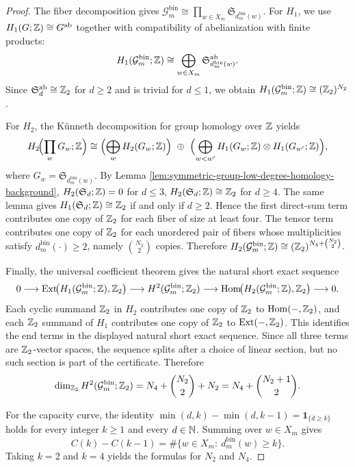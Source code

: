 \begin{proof}
The fiber decomposition gives
\(
\mathcal{G}^{\mathrm{bin}}_m\cong \prod_{w\in X_m}\mathfrak{S}_{d^{\mathrm{bin}}_m(w)}
\).
For \(H_1\), we use \(H_1(G;\mathbb{Z})\cong G^{\mathrm{ab}}\) together with compatibility of abelianization with finite products:
\[
H_1(\mathcal{G}^{\mathrm{bin}}_m;\mathbb{Z})
\cong
\bigoplus_{w\in X_m}\mathfrak{S}_{d^{\mathrm{bin}}_m(w)}^{\mathrm{ab}}.
\]
Since \(\mathfrak{S}_d^{\mathrm{ab}}\cong\mathbb{Z}_2\) for \(d\ge 2\) and is trivial for \(d\le 1\), we obtain
\(
H_1(\mathcal{G}^{\mathrm{bin}}_m;\mathbb{Z})\cong (\mathbb{Z}_2)^{N_2}
\).
\par
For \(H_2\), the K\"unneth decomposition for group homology over \(\mathbb{Z}\) yields
\[
H_2\!\Bigl(\prod_{w}G_w;\mathbb{Z}\Bigr)
\cong
\Bigl(\bigoplus_{w}H_2(G_w;\mathbb{Z})\Bigr)\ \oplus\
\Bigl(\bigoplus_{w<w'}H_1(G_w;\mathbb{Z})\otimes H_1(G_{w'};\mathbb{Z})\Bigr),
\]
where \(G_w=\mathfrak{S}_{d^{\mathrm{bin}}_m(w)}\).
By Lemma \ref{lem:symmetric-group-low-degree-homology-background},
\(
H_2(\mathfrak{S}_d;\mathbb{Z})=0
\)
for \(d\le 3\),
\(
H_2(\mathfrak{S}_d;\mathbb{Z})\cong\mathbb{Z}_2
\)
for \(d\ge 4\).
The same lemma gives
\(
H_1(\mathfrak{S}_d;\mathbb{Z})\cong\mathbb{Z}_2
\)
if and only if \(d\ge 2\).
Hence the first direct-sum term contributes one copy of \(\mathbb{Z}_2\) for each fiber of size at least four.  The tensor term contributes one copy of \(\mathbb{Z}_2\) for each unordered pair of fibers whose multiplicities satisfy \(d^{\mathrm{bin}}_m(\cdot)\ge 2\), namely \(\binom{N_2}{2}\) copies.
Therefore
\(
H_2(\mathcal{G}^{\mathrm{bin}}_m;\mathbb{Z})\cong (\mathbb{Z}_2)^{N_4+\binom{N_2}{2}}
\).
\par
Finally, the universal coefficient theorem gives the natural short exact sequence
\[
0\longrightarrow
\mathrm{Ext}\!\bigl(H_1(\mathcal{G}^{\mathrm{bin}}_m;\mathbb{Z}),\mathbb{Z}_2\bigr)
\longrightarrow
H^2(\mathcal{G}^{\mathrm{bin}}_m;\mathbb{Z}_2)
\longrightarrow
\mathrm{Hom}\!\bigl(H_2(\mathcal{G}^{\mathrm{bin}}_m;\mathbb{Z}),\mathbb{Z}_2\bigr)
\longrightarrow 0.
\]
Each cyclic summand \(\mathbb{Z}_2\) in \(H_2\) contributes one copy of \(\mathbb{Z}_2\) to \(\mathrm{Hom}(-,\mathbb{Z}_2)\), and each \(\mathbb{Z}_2\) summand of \(H_1\) contributes one copy of \(\mathbb{Z}_2\) to \(\mathrm{Ext}(-,\mathbb{Z}_2)\).
This identifies the end terms in the displayed natural short exact sequence.  Since all three terms are \(\mathbb{Z}_2\)-vector spaces, the sequence splits after a choice of linear section, but no such section is part of the certificate.  Therefore
\[
\dim_{\mathbb{Z}_2}H^2(\mathcal{G}^{\mathrm{bin}}_m;\mathbb{Z}_2)
=
N_4+\binom{N_2}{2}+N_2
=
N_4+\binom{N_2+1}{2}.
\]
\par
For the capacity curve, the identity
\(
\min(d,k)-\min(d,k-1)=\mathbf 1_{\{d\ge k\}}
\)
holds for every integer \(k\ge 1\) and every \(d\in\mathbb{N}\).
Summing over \(w\in X_m\) gives
\[
C(k)-C(k-1)=\#\{w\in X_m:\ d^{\mathrm{bin}}_m(w)\ge k\}.
\]
Taking \(k=2\) and \(k=4\) yields the formulas for \(N_2\) and \(N_4\). \qedhere
\end{proof}

